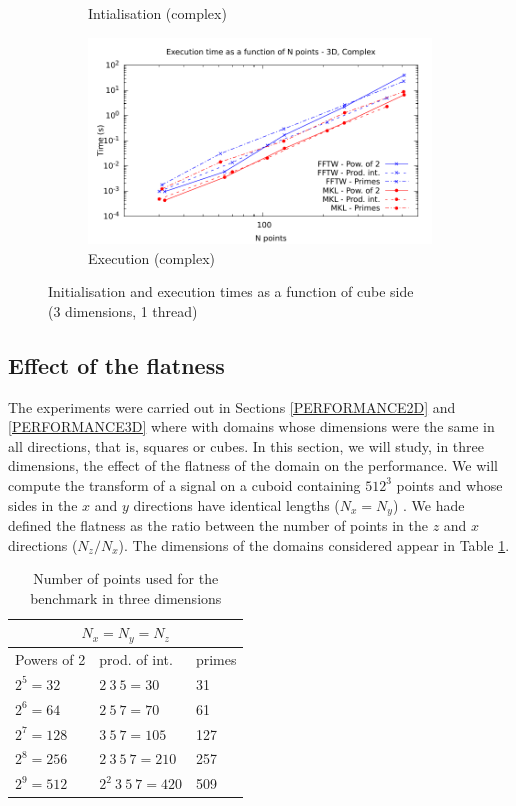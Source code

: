 \documentclass[12pt, a4paper]{article}
\begin{document}
\begin{figure}[H]
\begin{subfigure}{.5\textwidth}
\caption{Intialisation (complex)}
\label{3DCI}
\end{subfigure}%
\begin{subfigure}{.5\textwidth}
\centering
\includegraphics[width=.9\linewidth]{graphs/3d-exec-c.pdf}
\caption{Execution (complex)}
\label{3DC}
\end{subfigure}
\caption{Initialisation and execution times as a function of cube side\\(3 dimensions, 1 thread)}
\label{3D}
\end{figure}
\subsection{Effect of the flatness}\label{FLATNESS}

The experiments were carried out in Sections \ref{PERFORMANCE2D} and \ref{PERFORMANCE3D} where with domains whose dimensions were the same in all directions, that is, squares or cubes. In this section, we will study, in three dimensions, the effect of the flatness of the domain on the performance. We will compute the transform of a signal on a cuboid containing $512^3$ points and whose sides in the $x$ and $y$ directions have identical lengths ($N_x=N_y$) . We hade defined the flatness as the ratio between the number of points in the $z$ and $x$ directions ($N_z/N_x$). The dimensions of the domains considered appear in Table \ref{FLATNESSDIM}.
\begin{table}[H]
\centering
\begin{tabular}{|l|l|l|}
  \hline
  \multicolumn{3}{|c|}{$N_x=N_y=N_z$}\\
  \hline
  \hline
  Powers of 2 & prod. of int. & primes\\ \hline

  
$2^5=32$ & $2\ 3\ 5=30$	& 31\\ \hline
$2^6=64$ & $2\ 5\ 7=70$	& 61\\ \hline
$2^7=128$ & $3\ 5\ 7=105$ & 127\\ \hline
$2^8=256$ & $2\ 3\ 5\ 7=210$ & 257\\ \hline
$2^9=512$ & $2^2\ 3\ 5\ 7=420$ & 509\\ \hline
\end{tabular}
\caption{Number of points used for the benchmark in three dimensions}\label{FLATNESSDIM}
\end{table}
\end{document}
